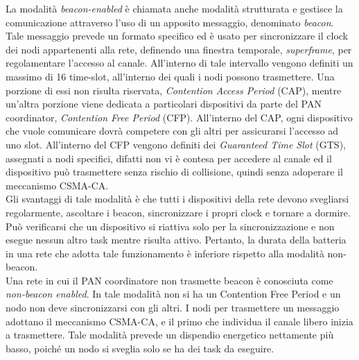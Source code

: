 \noindent La modalità \textit{beacon-enabled} è chiamata anche modalità strutturata e gestisce la comunicazione attraverso l'uso di un apposito messaggio, denominato \textit{beacon}. Tale messaggio prevede un formato specifico ed è usato per sincronizzare il clock dei nodi appartenenti alla rete, definendo una finestra temporale, \textit{superframe}, per regolamentare l'accesso al canale. All'interno di tale intervallo vengono definiti un massimo di 16 time-slot, all'interno dei quali i nodi possono trasmettere. 
Una porzione di essi non risulta riservata, \textit{Contention Access Period} (CAP), mentre un'altra porzione viene dedicata a particolari dispositivi da parte del PAN coordinator, \textit{Contention Free Period} (CFP).
All'interno del CAP, ogni dispositivo che vuole comunicare dovrà competere con gli altri per assicurarsi l'accesso ad uno slot. All'interno del CFP vengono definiti dei \textit{Guaranteed Time Slot} (GTS), assegnati a nodi specifici, difatti non vi è contesa per accedere al canale ed il dispositivo può trasmettere senza rischio di collisione, quindi senza adoperare il meccanismo CSMA-CA.\\
Gli svantaggi di tale modalità è che tutti i dispositivi della rete devono svegliarsi regolarmente, ascoltare i beacon, sincronizzare i propri clock e tornare a dormire. Può verificarsi che un dispositivo si riattiva solo per la sincronizzazione e non esegue nessun altro task mentre risulta attivo. Pertanto, la durata della batteria in una rete che adotta tale funzionamento è inferiore rispetto alla modalità non-beacon.\\

\noindent Una rete in cui il PAN coordinatore non trasmette beacon è conosciuta come \textit{non-beacon enabled}. In tale modalità non si ha un Contention Free Period e un nodo non deve sincronizzarsi con gli altri. I nodi per trasmettere un messaggio adottano il meccanismo CSMA-CA, e il primo che individua il canale libero inizia a trasmettere. Tale modalità prevede un dispendio energetico nettamente più basso, poiché un nodo si sveglia solo se ha dei task da eseguire.


